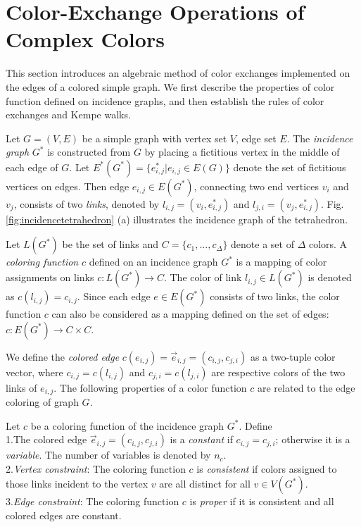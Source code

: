 \documentclass[11pt]{article}
\newenvironment{definition}[1][Definition]{\begin{trivlist}
\item[\hskip \labelsep {\bfseries #1}]}{\end{trivlist}}
\begin{document}
\section{Color-Exchange Operations of Complex Colors}

This section introduces an algebraic method of color exchanges implemented on the edges of a colored simple graph. We first describe the properties of color function defined on incidence graphs, and then establish the rules of color exchanges and Kempe walks. 

Let $G=(V,E)$ be a simple graph with vertex set $V$, edge set $E$. The {\it incidence graph} $G^*$ is constructed from $G$ by placing a fictitious vertex in the middle of each edge of $G$. Let $E^*(G^*)=\{e_{i,j}^{*}| e_{i,j}\in E(G) \}$ denote the set of fictitious vertices on edges. Then edge $e_{i,j}\in E(G^* )$, connecting two end vertices $v_i$ and $v_j$, consists of two {\it links}, denoted by $l_{i,j}=(v_i,e_{i,j}^{*})$ and $l_{j,i}=(v_j,e_{i,j}^{*})$. Fig. \ref{fig:incidencetetrahedron} (a) illustrates the incidence graph of the tetrahedron.

Let $L(G^*)$ be the set of links and $C=\{c_1,...,c_\Delta \}$ denote a set of $\Delta$ colors. A {\it coloring function} $c$ defined on an incidence graph $G^*$ is a mapping of color assignments on links $c:L(G^* )\rightarrow C$. The color of link $l_{i,j}\in L(G^* )$ is denoted as $c(l_{i,j} )=c_{i,j}$. Since each edge $e\in E(G^* )$ consists of two links, the color function $c$ can also be considered as a mapping defined on the set of edges: $c:E(G^* )\rightarrow C\times C$.	

We define the {\it colored edge} $c(e_{i,j} )= \vec{e}_{i,j}=(c_{i,j},c_{j,i} )$ as a two-tuple color vector, where $c_{i,j}=c(l_{i,j} )$ and $c_{j,i}=c(l_{j,i} )$ are respective colors of the two links of $e_{i,j}$. The following properties of a color function $c$ are related to the edge coloring of graph $G$. 

\begin{definition}
\label{definition:coloring}
Let $c$ be a coloring function of the incidence graph $G^*$. Define\\
1.The colored edge $\vec{e}_{i,j}=(c_{i,j},c_{j,i} )$ is a {\it constant} if $c_{i,j}=c_{j,i}$; otherwise it is a {\it variable}. The number of variables is denoted by $n_c$.\\
2.{\it Vertex constraint}: The coloring function $c$ is {\it consistent} if colors assigned to those links incident to the vertex $v$ are all distinct for all $v\in V(G^*)$.	\\
3.{\it Edge constraint}: The coloring function $c$ is {\it proper} if it is consistent and all colored edges are constant.
\end{definition}
\end{document}
